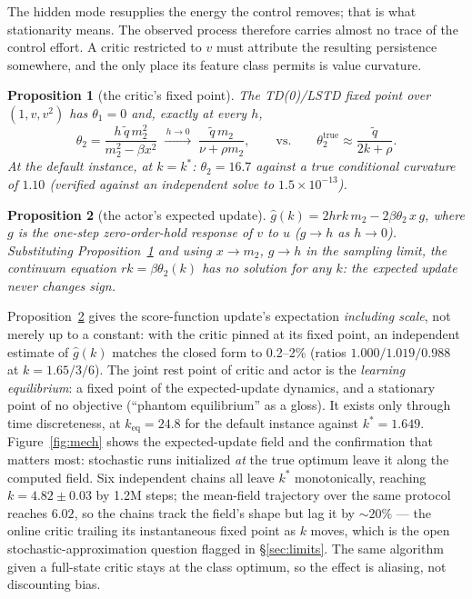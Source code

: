 \documentclass[11pt]{article}
\newtheorem{proposition}{Proposition}
\newcommand{\keq}{k_{\mathrm{eq}}}
\begin{document}
The hidden mode resupplies the energy the control removes; that is what stationarity means.
The observed process therefore carries almost no trace of the control effort. A critic restricted
to $v$ must attribute the resulting persistence somewhere, and the only place its feature
class permits is value curvature.

\begin{proposition}[the critic's fixed point]\label{prop:critic}
The TD(0)/LSTD fixed point over $(1,v,v^2)$ has $\theta_1 = 0$ and, exactly at every $h$,
\[
\theta_2 = \frac{h\,\tilde q\, m_2^2}{m_2^2 - \beta x^2}
\;\xrightarrow{\,h\to0\,}\; \frac{\tilde q\, m_2}{\nu + \rho m_2},
\qquad\text{vs.}\qquad
\theta_2^{\mathrm{true}} \approx \frac{\tilde q}{2k+\rho}.
\]
At the default instance, at $k = k^\ast$: $\theta_2 = 16.7$ against a true conditional
curvature of $1.10$ (verified against an independent solve to $1.5\times10^{-13}$).
\end{proposition}

\begin{proposition}[the actor's expected update]\label{prop:actor}
$\hat g(k) = 2hrk\,m_2 - 2\beta\theta_2\, x\, g$, where $g$ is the one-step zero-order-hold
response of $v$ to $u$ ($g \to h$ as $h\to0$). Substituting Proposition~\ref{prop:critic} and
using $x \to m_2$, $g \to h$ in the sampling limit, the continuum equation
$rk = \beta\theta_2(k)$ has no solution for any $k$: the expected update never changes sign.
\end{proposition}

Proposition~\ref{prop:actor} gives the score-function update's expectation \emph{including
scale}, not merely up to a constant: with the critic pinned at its fixed point, an independent
estimate of $\hat g(k)$ matches the closed form to 0.2--2\% (ratios $1.000/1.019/0.988$ at
$k = 1.65/3/6$). The joint rest point of critic and actor is the \emph{learning equilibrium}: a
fixed point of the expected-update dynamics, and a stationary point of no objective (``phantom
equilibrium'' as a gloss). It exists only through time discreteness, at $\keq = 24.8$ for the
default instance against $k^\ast = 1.649$. Figure~\ref{fig:mech} shows the expected-update
field and the confirmation that matters most: stochastic runs initialized \emph{at} the true
optimum leave it along the computed field. Six independent chains all leave $k^\ast$
monotonically, reaching $k = 4.82 \pm 0.03$ by 1.2M steps; the mean-field trajectory over the
same protocol reaches $6.02$, so the chains track the field's shape but lag it by ${\sim}20\%$
--- the online critic trailing its instantaneous fixed point as $k$ moves, which is the open
stochastic-approximation question flagged in \S\ref{sec:limits}. The same algorithm given a
full-state critic stays at the class optimum, so the effect is aliasing, not discounting bias.
\end{document}
